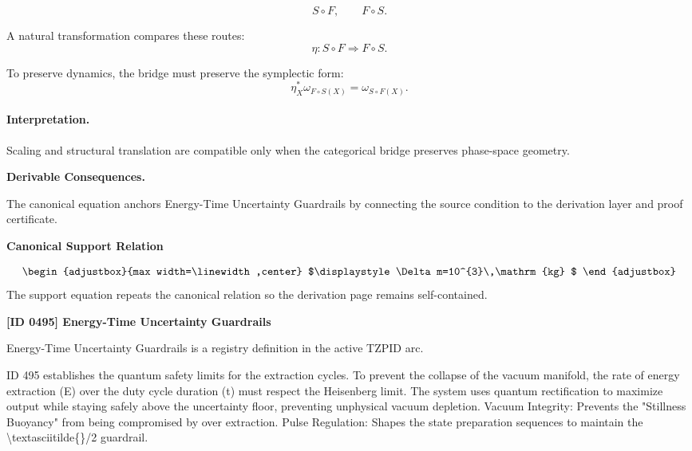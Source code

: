 \begin{equation}
S\circ F,
\qquad
F\circ S.
\end{equation}

A natural transformation compares these routes:
\begin{equation}
\eta:S\circ F\Rightarrow F\circ S.
\end{equation}

To preserve dynamics, the bridge must preserve the symplectic form:
\begin{equation}
\boxed{
\eta_X^{*}\omega_{F\circ S(X)}
=
\omega_{S\circ F(X)}.
}
\end{equation}

\paragraph{Interpretation.}
Scaling and structural translation are compatible only when the categorical bridge preserves phase-space geometry.

\par\vspace{0.35em}
\noindent\textbf{Derivable Consequences.}\quad
\begingroup
\footnotesize
\raggedright
The canonical equation anchors Energy-Time Uncertainty Guardrails by connecting the source condition to the derivation layer and proof certificate.
\par\endgroup

\noindent\textbf{Canonical Support Relation}\par
\[
\begin{adjustbox}{max width=\linewidth,center}
$\displaystyle
\Delta m=10^{3}\,\mathrm{kg}
$
\end{adjustbox}
\]
\noindent The support equation repeats the canonical relation so the derivation page remains self-contained.\par

\clearpage
\noindent\textbf{[ID 0495] Energy-Time Uncertainty Guardrails}\par
\vspace{0.35em}
\begingroup\small
{}
Energy-Time Uncertainty Guardrails is a registry definition in the active TZPID arc.

ID 495 establishes the quantum safety limits for the extraction cycles. To prevent the collapse of the vacuum manifold, the rate of energy extraction (E) over the duty cycle duration (t) must respect the Heisenberg limit. The system uses quantum rectification to maximize output while staying safely above the uncertainty floor, preventing unphysical vacuum depletion. Vacuum Integrity: Prevents the "Stillness Buoyancy" from being compromised by over extraction. Pulse Regulation: Shapes the state preparation sequences to maintain the \textbackslash{}textasciitilde\{\}/2 guardrail.

